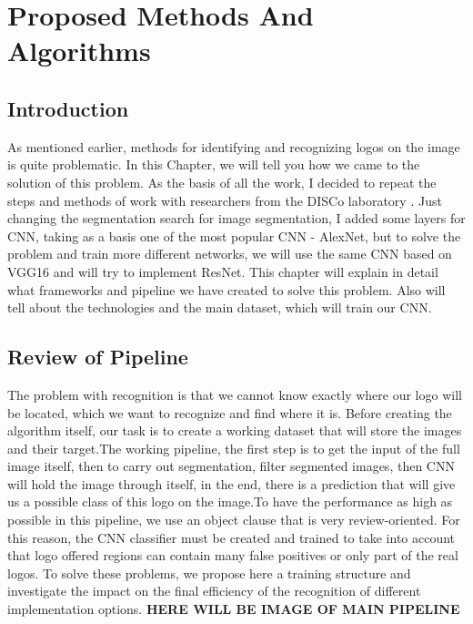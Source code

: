 \chapter{Proposed Methods And Algorithms}\label{ch:D}
\section{Introduction}\label{sec:4.1}
\par As mentioned earlier, methods for identifying and recognizing logos on the image is quite problematic. In this Chapter, we will tell you how we came to the solution of this problem. As the basis of all the work, I decided to repeat the steps and methods of work with researchers from the DISCo laboratory \cite{DeepLearningForLogo}. Just changing the segmentation search for image segmentation, I added some layers for CNN, taking as a basis one of the most popular CNN - AlexNet, but to solve the problem and train more different networks, we will use the same CNN based on VGG16 and will try to implement ResNet. This chapter will explain in detail what frameworks and pipeline we have created to solve this problem. Also will tell about the technologies and the main dataset, which will train our CNN. 

\section{Review of Pipeline}\label{sec:4.2}
\par The problem with recognition is that we cannot know exactly where our logo will be located, which we want to recognize and find where it is. Before creating the algorithm itself, our task is to create a working dataset that will store the images and their target.The working pipeline, the first step is to get the input of the full image itself, then to carry out segmentation, filter segmented images, then CNN will hold the image through itself, in the end, there is a prediction that will give us a possible class of this logo on the image.To have the performance as high as possible in this pipeline, we use an object clause that is very review-oriented. For this reason, the CNN classifier must be created and trained to take into account that logo offered regions can contain many false positives or only part of the real logos. To solve these problems, we propose here a training structure and investigate the impact on the final efficiency of the recognition of different implementation options. \textbf{HERE WILL BE IMAGE OF MAIN PIPELINE}


